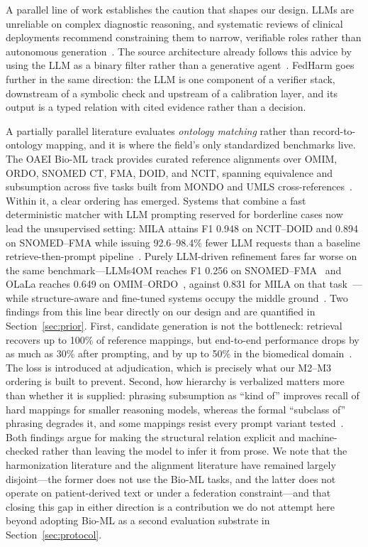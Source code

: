 \documentclass[conference]{IEEEtran}
\begin{document}
A parallel line of work establishes the caution that shapes our design. LLMs are unreliable on complex diagnostic reasoning, and systematic reviews of clinical deployments recommend constraining them to narrow, verifiable roles rather than autonomous generation~\cite{b45,b44}. The source architecture already follows this advice by using the LLM as a binary filter rather than a generative agent~\cite{b1}. FedHarm goes further in the same direction: the LLM is one component of a verifier stack, downstream of a symbolic check and upstream of a calibration layer, and its output is a typed relation with cited evidence rather than a decision.

A partially parallel literature evaluates \emph{ontology matching} rather than record-to-ontology mapping, and it is where the field's only standardized benchmarks live. The OAEI Bio-ML track provides curated reference alignments over OMIM, ORDO, SNOMED CT, FMA, DOID, and NCIT, spanning equivalence and subsumption across five tasks built from MONDO and UMLS cross-references~\cite{b55}. Within it, a clear ordering has emerged. Systems that combine a fast deterministic matcher with LLM prompting reserved for borderline cases now lead the unsupervised setting: MILA attains F1 0.948 on NCIT--DOID and 0.894 on SNOMED--FMA while issuing 92.6--98.4\% fewer LLM requests than a baseline retrieve-then-prompt pipeline~\cite{b54}. Purely LLM-driven refinement fares far worse on the same benchmark---LLMs4OM reaches F1 0.256 on SNOMED--FMA~\cite{b56} and OLaLa reaches 0.649 on OMIM--ORDO~\cite{b57}, against 0.831 for MILA on that task~\cite{b54}---while structure-aware and fine-tuned systems occupy the middle ground~\cite{b58,b59,b61}. Two findings from this line bear directly on our design and are quantified in Section~\ref{sec:prior}. First, candidate generation is not the bottleneck: retrieval recovers up to 100\% of reference mappings, but end-to-end performance drops by as much as 30\% after prompting, and by up to 50\% in the biomedical domain~\cite{b54}. The loss is introduced at adjudication, which is precisely what our M2--M3 ordering is built to prevent. Second, how hierarchy is verbalized matters more than whether it is supplied: phrasing subsumption as ``kind of'' improves recall of hard mappings for smaller reasoning models, whereas the formal ``subclass of'' phrasing degrades it, and some mappings resist every prompt variant tested~\cite{b60}. Both findings argue for making the structural relation explicit and machine-checked rather than leaving the model to infer it from prose. We note that the harmonization literature and the alignment literature have remained largely disjoint---the former does not use the Bio-ML tasks, and the latter does not operate on patient-derived text or under a federation constraint---and that closing this gap in either direction is a contribution we do not attempt here beyond adopting Bio-ML as a second evaluation substrate in Section~\ref{sec:protocol}.
\end{document}
